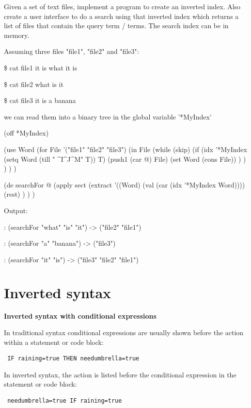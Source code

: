 Given a set of text files, implement a program to create an inverted
index. Also create a user interface to do a search using that inverted
index which returns a list of files that contain the query term / terms.
The search index can be in memory.


\begin{wideverbatim}

Assuming three files "file1", "file2" and "file3":

\$ cat file1
it is what it is

\$ cat file2
what is it

\$ cat file3
it is a banana

we can read them into a binary tree in the global variable '*MyIndex'

(off *MyIndex)

(use Word
   (for File '("file1" "file2" "file3")
      (in File
         (while (skip)
            (if (idx '*MyIndex (setq Word (till " ^I^J^M" T)) T)
               (push1 (car @) File)
               (set Word (cons File)) ) ) ) ) )

(de searchFor @
   (apply sect
      (extract
         '((Word) (val (car (idx '*MyIndex Word))))
         (rest) ) ) )

Output:

: (searchFor "what" "is" "it")
-> ("file2" "file1")

: (searchFor "a" "banana")
-> ("file3")

: (searchFor "it" "is")
-> ("file3" "file2" "file1")

\end{wideverbatim}

\pagebreak{}
\section*{Inverted syntax}

\textbf{Inverted syntax with conditional expressions}

In traditional syntax conditional expressions are usually shown before
the action within a statement or code block:

\begin{verbatim}
 IF raining=true THEN needumbrella=true 
\end{verbatim}

In inverted syntax, the action is listed before the conditional
expression in the statement or code block:

\begin{verbatim}
 needumbrella=true IF raining=true 
\end{verbatim}

